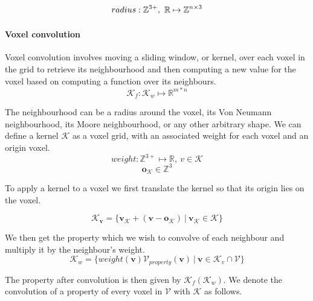 \begin{equation}
    radius: \mathbb{Z}^{3+},\ \mathbb{R} \mapsto \mathbb{Z}^{n \times 3}
\end{equation}

\paragraph{Voxel convolution}
Voxel convolution involves moving a sliding window, or kernel, over each voxel in the grid to retrieve its neighbourhood and then computing a new value for the voxel based on computing a function  over its neighbours.
\begin{equation}
    \label{eq:convolution}
    \mathcal{K}_f: \mathcal{K}_w \mapsto \mathbb{R}^{m*n}
\end{equation}

The neighbourhood can be a radius around the voxel, its Von Neumann neighbourhood, its Moore neighbourhood, or any other arbitrary shape. We can define a kernel \(\mathcal{K}\) as a voxel grid, with an associated weight for each voxel  and an origin voxel.
\begin{equation}
weight: \mathbb{Z}^{3+} \mapsto \mathbb{R},\ v \in {\mathcal{K}}
\end{equation}
\begin{equation}
\boldsymbol{o}_{\mathcal{K}} \in \mathbb{Z}^{3}
\end{equation}

To apply a kernel to a voxel we first translate the kernel so that its origin lies on the voxel.

\begin{equation}
    \label{eq:kv}
\mathcal{K}_{\boldsymbol{v}} = \{\boldsymbol{v_{\mathcal{K}}} + (\boldsymbol{v} - \boldsymbol{o_{\mathcal{K}}})\ |\ \boldsymbol{v_{\mathcal{K}}} \in \mathcal{K}\}
\end{equation}

We then get the property which we wish to convolve of each neighbour and multiply it by the neighbour's weight.
\begin{equation}
    \label{eq:kw}
    \mathcal{K}_{w} = \{weight(\boldsymbol{v})\mathcal{V}_{property}(\boldsymbol{v})\ |\ \boldsymbol{v} \in \mathcal{K}_{v} \cap \mathcal{V}\}
\end{equation}

The property after convolution is then given by \(\mathcal{K}_f(\mathcal{K}_{w})\). We denote the convolution of a property of every voxel in \(\mathcal{V}\) with \(\mathcal{K}\) as follows.

